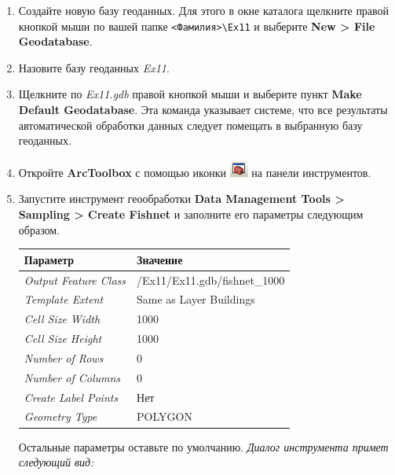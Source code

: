\documentclass[12pt,]{book}
\begin{document}
\begin{enumerate}
\def\labelenumi{\arabic{enumi}.}
\item
  Создайте новую базу геоданных. Для этого в окне каталога щелкните правой кнопкой мыши по вашей папке \texttt{\textless{}Фамилия\textgreater{}\textbackslash{}Ex11} и выберите \textbf{New \textgreater{} File Geodatabase}.
\item
  Назовите базу геоданных \emph{Ex11}.
\item
  Щелкните по \emph{Ex11.gdb} правой кнопкой мыши и выберите пункт \textbf{Make Default Geodatabase}. Эта команда указывает системе, что все результаты автоматической обработки данных следует помещать в выбранную базу геоданных.
\item
  Откройте \textbf{ArcToolbox} с помощью иконки \includegraphics{images/Ex11/image7.png} на панели инструментов.
\item
  Запустите инструмент геообработки \textbf{Data Management Tools \textgreater{} Sampling \textgreater{} Create Fishnet} и заполните его параметры следующим образом.

  \begin{longtable}[]{@{}ll@{}}
  \toprule
  Параметр & Значение\tabularnewline
  \midrule
  \endhead
  \emph{Output Feature Class} & /Ex11/Ex11.gdb/fishnet\_1000\tabularnewline
  \emph{Template Extent} & Same as Layer Buildings\tabularnewline
  \emph{Cell Size Width} & 1000\tabularnewline
  \emph{Cell Size Height} & 1000\tabularnewline
  \emph{Number of Rows} & 0\tabularnewline
  \emph{Number of Columns} & 0\tabularnewline
  \emph{Create Label Points} & Нет\tabularnewline
  \emph{Geometry Type} & POLYGON\tabularnewline
  \bottomrule
  \end{longtable}

  Остальные параметры оставьте по умолчанию. \emph{Диалог инструмента примет следующий вид:}


\end{enumerate}
\end{document}
